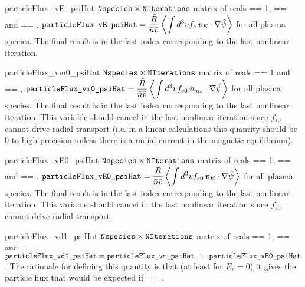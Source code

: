 \myhrule

{particleFlux_vE_psiHat}
{$\text{\ttfamily Nspecies} \times \text{\ttfamily NIterations}$ matrix of reals}
{ == 1,  == \true and  == \true.}
{$\displaystyle \text{\ttfamily particleFlux\_vE\_psiHat} = \frac{\bar{R}}{\bar{n} \bar{v}} \left\langle \int d^3v f_s \, \bm{v}_{E} \cdot \nabla \hat{\psi}\right\rangle$ for all plasma species. The final result is in the last index corresponding to the last nonlinear iteration.}

\myhrule

{particleFlux_vm0_psiHat}
{$\text{\ttfamily Nspecies} \times \text{\ttfamily NIterations}$ matrix of reals}
{ == 1 and  == \true.}
{$\displaystyle \text{\ttfamily particleFlux\_vm0\_psiHat} = \frac{\bar{R}}{\bar{n} \bar{v}} \left\langle \int d^3v f_{s0} \, \bm{v}_{ms} \cdot \nabla \hat{\psi}\right\rangle$ for all plasma species. The final result is in the last index corresponding to the last nonlinear iteration. This variable should cancel  in the last nonlinear iteration since $f_{s0}$ cannot drive radial transport (i.e. in a linear calculations this quantity should be 0 to high precision unless there is a radial current in the magnetic equilibrium).}

\myhrule

{particleFlux_vE0_psiHat}
{$\text{\ttfamily Nspecies} \times \text{\ttfamily NIterations}$ matrix of reals}
{ == 1,  == \true and  == \true.}
{$\displaystyle \text{\ttfamily particleFlux\_vE0\_psiHat} = \frac{\bar{R}}{\bar{n} \bar{v}} \left\langle \int d^3v f_{s0} \, \bm{v}_{E} \cdot \nabla \hat{\psi}\right\rangle$ for all plasma species. The final result is in the last index corresponding to the last nonlinear iteration. This variable should cancel  in the last nonlinear iteration since $f_{s0}$ cannot drive radial transport.}

\myhrule

{particleFlux_vd1_psiHat}
{$\text{\ttfamily Nspecies} \times \text{\ttfamily NIterations}$ matrix of reals}
{ == 1,  == \true and  == \true.}
{$\displaystyle \text{\ttfamily particleFlux\_vd1\_psiHat} = \text{\ttfamily particleFlux\_vm\_psiHat}~+~\text{\ttfamily particleFlux\_vE0\_psiHat}$. The rationale for defining this quantity is that (at least for $E_r = 0$) it gives the particle flux that would be expected if  == \false.}

